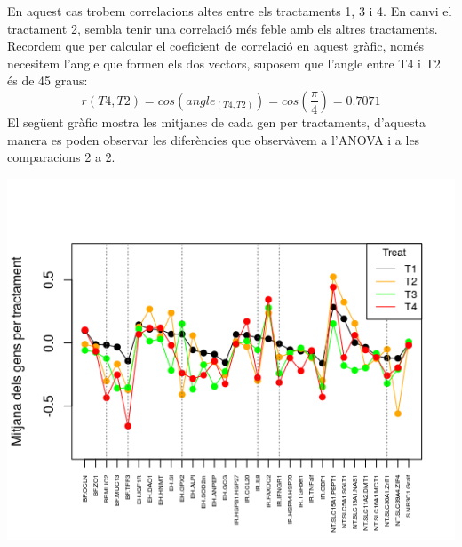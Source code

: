 \documentclass[english]{article}
\begin{document}
En aquest cas trobem correlacions altes entre els tractaments 1, 3 i 4. En canvi el tractament 2, sembla tenir una correlació més feble amb els altres tractaments. Recordem que per calcular el coeficient de correlació en aquest gràfic, només necesitem l'angle que formen els dos vectors, suposem que l'angle entre T4 i T2 és de 45 graus:
\begin{equation*}
r(T4,T2)= cos(angle_{(T4,T2)})= cos(\frac{\pi}{4})= 0.7071
\end{equation*}
El següent gràfic mostra les mitjanes de cada gen per tractaments, d'aquesta manera es poden observar les diferències que observàvem a l'ANOVA i a les comparacions 2 a 2.
\begin{center}
\includegraphics[scale=0.6]{lineploti.png}
\end{center}
\end{document}

